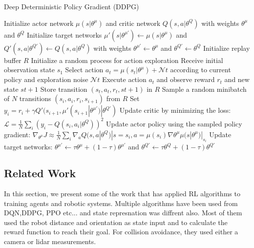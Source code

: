 \documentclass[12pt]{extarticle}
\begin{document}
 
\begin{algorithm}[H]
\caption{Deep Deterministic Policy Gradient (DDPG)}
\label{alg:ddpg}
\begin{algorithmic}[1]
\State Initialize actor network $\mu(s|\theta^\mu)$ and critic network $Q(s,a|\theta^Q)$ with weights $\theta^\mu$ and $\theta^Q$
\State Initialize target networks $\mu'(s|\theta^{\mu'}) \leftarrow \mu(s|\theta^\mu)$ and $Q'(s,a|\theta^{Q'}) \leftarrow Q(s,a|\theta^Q)$ with weights $\theta^{\mu'} \leftarrow \theta^\mu$ and $\theta^{Q'} \leftarrow \theta^Q$
\State Initialize replay buffer $R$
\State Initialize a random process for action exploration
\State Receive initial observation state $s_1$
\State Select action $a_t = \mu(s_t|\theta^\mu) + \mathcal{N}t$ according to current policy and exploration noise $\mathcal{N}t$
\State Execute action $a_t$ and observe reward $r_t$ and new state $s{t+1}$
\State Store transition $(s_t, a_t, r_t, s{t+1})$ in $R$
\State Sample a random minibatch of $N$ transitions $(s_i, a_i, r_i, s_{i+1})$ from $R$
\State Set $y_i = r_i + \gamma Q'(s_{i+1},\mu'(s_{i+1}|\theta^{\mu'})|\theta^{Q'})$
\State Update critic by minimizing the loss: $\mathcal{L} = \frac{1}{N}\sum_i(y_i - Q(s_i,a_i|\theta^Q))^2$
\State Update actor policy using the sampled policy gradient: $\nabla_{\theta^\mu} J \approx \frac{1}{N}\sum_i \nabla_a Q(s,a|\theta^Q)|{s=s_i,a=\mu(s_i)} \nabla{\theta^\mu} \mu(s|\theta^\mu)|_{s_i}$
\State Update target networks: $\theta^{\mu'} \leftarrow \tau \theta^\mu + (1-\tau)\theta^{\mu'}$ and $\theta^{Q'} \leftarrow \tau \theta^Q + (1-\tau)\theta^{Q'}$
\EndFor
\EndFor
\end{algorithmic}
\end{algorithm}



\subsection{Related Work}
In this section, we present some of the work that has applied RL algorithms to training agents and robotic systems. Multiple algorithms have been used from DQN,DDPG, PPO etc... and state represnation was diffrent also. Most of them used the robot distance and orientation as state input and to calculate the reward function to reach their goal. For collision avoidance, they used either a camera or lidar measurements.
\end{document}
